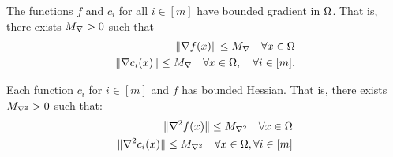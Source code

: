 \begin{assumption}
\label{bounded_gradients_lemma}
The functions $f$ and $c_i$ for all $ i \in [m]$ have bounded gradient in $ \Omega $.
That is, there exists ${M_{\nabla}} > 0$ such that
\begin{align*}
\|\nabla f(x)\| \le {M_{\nabla}} \quad  \forall x \in \Omega \\
\|\nabla c_i(x)\| \le {M_{\nabla}} \quad  \forall x \in \Omega, \quad \forall i \in [m].
\end{align*}
\end{assumption}

\begin{assumption}
\label{bounded_hessians_assumption}
Each function $c_i$ for $i \in [m]$ and $f$ has bounded Hessian. That is, there exists $ {M_{\nabla^2}} > 0$ such that:
\begin{align*}
\|\nabla^2 f(x) \| \le {M_{\nabla^2}} \quad \forall x \in \Omega \\
\|\nabla^2 c_i(x) \| \le {M_{\nabla^2}} \quad \forall x \in \Omega, \forall i \in [m]
\end{align*}
\end{assumption}




